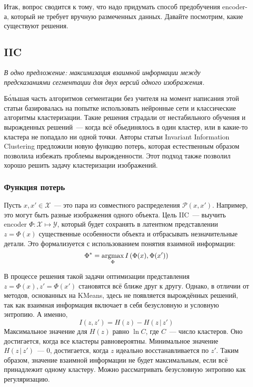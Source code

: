 Итак, вопрос сводится к тому, что надо придумать способ предобучения encoder-а, который не требует вручную размеченных данных.
Давайте посмотрим, какие существуют решения.
\subsection{IIC}
    \textit{В одно предложение: максимизация взаимной информации между предсказаниями сегментации для двух версий одного изображения.}
    \bigskip

    Б\'{о}льшая часть алгоритмов сегментации без учителя на момент написания этой статьи базировалась на попытке 
    использовать нейронные сети и классические алгоритмы кластеризации.
    Такие решения страдали от нестабильного обучения и вырожденных решений~--- 
    когда всё обьединялось в один кластер, или в какие-то кластера не попадало ни одной точки.
    Авторы статьи Invariant Information Clustering предложили новую функцию потерь, 
    которая естественным образом позволила избежать проблемы вырожденности.
    Этот подход также позволил хорошо решить задачу кластеризации изображений.

    \subsubsection{Функция потерь}
    Пусть $x, x' \in \mathcal{X}$~--- это пара из совместного распределения $\mathcal{P}(x, x')$.
    Например, это могут быть разные изображения одного объекта.
    Цель IIC~--- выучить encoder $\Phi\colon \mathcal{X} \mapsto \mathcal{Y}$, который будет сохранять в 
    латентном представлении $z = \Phi(x)$ существенные особенности объекта и отбрасывать незначительные детали.
    Это формализуется с использованием понятия взаимной информации:
    \begin{equation}
        \Phi^* = \operatorname*{argmax}_{\Phi} I \left( \Phi(x), \Phi(x') \right)
    \end{equation}

    В процессе решения такой задачи оптимизации представления $z = \Phi(x), z' = \Phi(x')$ становятся всё ближе друг к другу.
    Однако, в отличии от методов, основанных на KMeans, здесь не появляется вырождённых решений,
    так как взаимная информация включает в себя безусловную и условную энтропию. А именно, 
    \begin{equation}
        I(z, z') = H(z) - H(z\, | \, z')
    \end{equation}
    Максимальное значение для $H(z)$ равно $\ln C$, где $C$~--- число кластеров. Оно достигается, когда все кластеры равновероятны.
    Минимальное значение $H(z \, | \, z')$~--- $0$, достигается, когда $z$ идеально восстанавливается по $z'$.
    Таким образом, значение взаимной информации не будет максимальным, если всё принадлежит одному кластеру.
    Можно рассматривать безусловную энтропию как регуляризацию.

